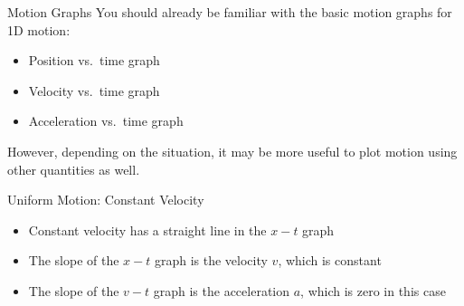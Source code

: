 \documentclass[12pt,compress,aspectratio=169,dvipsnames]{beamer}
\begin{document}
\begin{frame}{Motion Graphs}
  You should already be familiar with the basic motion graphs for 1D motion:
  \begin{itemize}
  \item Position vs.\ time graph
  \item Velocity vs.\ time graph
  \item Acceleration vs.\ time graph
  \end{itemize}

  However, depending on the situation, it may be more useful to plot motion
  using other quantities as well.
\end{frame}



\begin{frame}{Uniform Motion: Constant Velocity}
  \begin{center}
    \hspace{.15in}
    \hspace{.15in}
  \end{center}
  \begin{itemize}
  \item Constant velocity has a straight line in the $x-t$ graph
  \item The slope of the $x-t$ graph is the velocity $v$, which is constant
  \item The slope of the $v-t$ graph is the acceleration $a$, which is zero in
    this case
  \end{itemize}
\end{frame}
\end{document}
